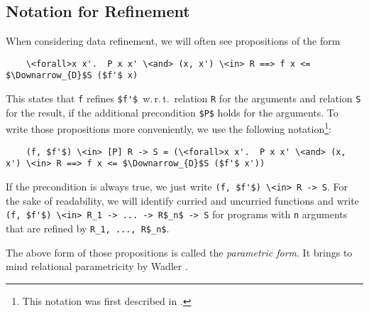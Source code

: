 \documentclass[acmsmall]{acmart}
\newcommand{\is}{\lstinline[language=isabelle]}
\newcommand{\wrt}{w.\,r.\,t.\xspace}
\begin{document}






\subsection{Notation for Refinement}\label{sec:nres:param-notation}

When considering data refinement, we will often see propositions of the form
\begin{lstlisting}
    \<forall>x x'.  P x x' \<and> (x, x') \<in> R ==> f x <= $\Downarrow_{D}$S ($f'$ x)
\end{lstlisting}
This states that \is{f} refines \is{$f'$}~\wrt\ relation \is{R} for the arguments and relation \is{S} for the result, if the additional precondition \is{$P$} holds for the arguments.
To write those propositions more conveniently, we use the following notation\footnote{This notation was first described in \cite[\S 2.2]{Lammich16CPP}.}:
\begin{lstlisting}
    (f, $f'$) \<in> [P] R -> S = (\<forall>x x'.  P x x' \<and> (x, x') \<in> R ==> f x <= $\Downarrow_{D}$S ($f'$ x'))
\end{lstlisting}
If the precondition is always true, we just write \is{(f, $f'$) \<in> R -> S}.
For the sake of readability, we will identify curried and uncurried functions and write
\is{(f, $f'$) \<in> R_1 -> ... -> R$_n$ -> S}
for programs with \is{n} arguments that are refined by \is{R_1, ..., R$_n$}.



The above form of those propositions is called the \emph{parametric form}.
It brings to mind relational parametricity by Wadler \cite{Wadler89}.
\end{document}
